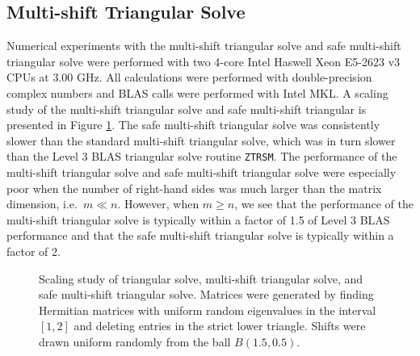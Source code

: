 \documentclass{article}
\begin{document}
\subsection{Multi-shift Triangular Solve}
Numerical experiments with the multi-shift triangular solve and safe
multi-shift triangular solve were performed with two 4-core Intel
Haswell Xeon E5-2623 v3 CPUs at 3.00 GHz. All calculations were
performed with double-precision complex numbers and BLAS calls were
performed with Intel MKL. A scaling study of the multi-shift
triangular solve and safe multi-shift triangular is presented in
Figure \ref{fig:mstrsm}. The safe multi-shift triangular solve was
consistently slower than the standard multi-shift triangular solve,
which was in turn slower than the Level 3 BLAS triangular solve
routine \texttt{ZTRSM}. The performance of the multi-shift triangular
solve and safe multi-shift triangular solve were especially poor when
the number of right-hand sides was much larger than the matrix
dimension, i.e.\ \(m\ll n\). However, when \(m\geq n\), we see that
the performance of the multi-shift triangular solve is typically
within a factor of 1.5 of Level 3 BLAS performance and that the safe
multi-shift triangular solve is typically within a factor of 2.
\begin{figure}[H]
  \centering
  \caption{Scaling study of triangular solve, multi-shift triangular
    solve, and safe multi-shift triangular solve. Matrices were
    generated by finding Hermitian matrices with uniform random
    eigenvalues in the interval \(\left[1,2\right]\) and deleting
    entries in the strict lower triangle. Shifts were drawn uniform
    randomly from the ball \(B\left(1.5,0.5\right)\).}
  \label{fig:mstrsm}
\end{figure}
\end{document}
